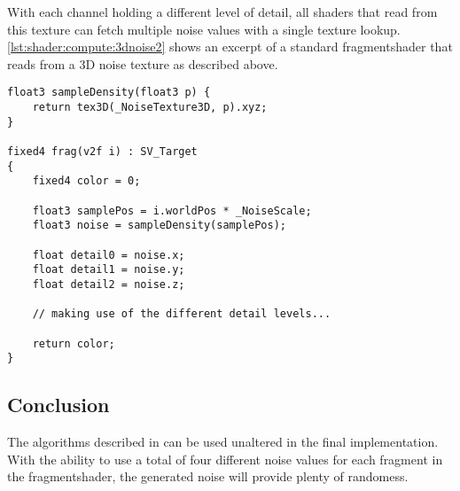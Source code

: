 \noindent
With each channel holding a different level of detail, all \gls{shader}s that read from this texture can fetch multiple \gls{noise} values with a single texture lookup.
\autoref{lst:shader:compute:3dnoise2} shows an excerpt of a standard \gls{fragmentshader} that reads from a 3D \gls{noise} texture as described above.
\begin{lstlisting}[language=HLSL, caption=An implementation of a shader making use of a 3D noise texture., label=lst:shader:compute:3dnoise2]
float3 sampleDensity(float3 p) {
    return tex3D(_NoiseTexture3D, p).xyz;
}

fixed4 frag(v2f i) : SV_Target
{
    fixed4 color = 0;

    float3 samplePos = i.worldPos * _NoiseScale;
    float3 noise = sampleDensity(samplePos);

    float detail0 = noise.x;
    float detail1 = noise.y;
    float detail2 = noise.z;

    // making use of the different detail levels...

    return color;
}
\end{lstlisting}

\subsection{Conclusion}
The algorithms described in  can be used unaltered in the final implementation.
With the ability to use a total of four different noise values for each \gls{fragment} in the \gls{fragmentshader}, the generated \gls{noise} will provide plenty of randomess.